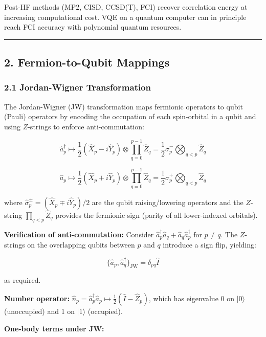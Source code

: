 \documentclass[
  11pt,
]{report}
\begin{document}
Post-HF methods (MP2, CISD, CCSD(T), FCI) recover correlation energy at
increasing computational cost. VQE on a quantum computer can in
principle reach FCI accuracy with polynomial quantum resources.

\begin{center}\rule{0.5\linewidth}{0.5pt}\end{center}

\subsection{2. Fermion-to-Qubit
Mappings}\label{fermion-to-qubit-mappings}

\subsubsection{2.1 Jordan-Wigner
Transformation}\label{jordan-wigner-transformation}

The Jordan-Wigner (JW) transformation maps fermionic operators to qubit
(Pauli) operators by encoding the occupation of each spin-orbital in a
qubit and using \(Z\)-strings to enforce anti-commutation:

\[\hat{a}_p^\dagger \mapsto \frac{1}{2}(\hat{X}_p - i\hat{Y}_p) \otimes \prod_{q=0}^{p-1} \hat{Z}_q = \frac{1}{2}\hat{\sigma}_p^- \bigotimes_{q<p} \hat{Z}_q\]

\[\hat{a}_p \mapsto \frac{1}{2}(\hat{X}_p + i\hat{Y}_p) \otimes \prod_{q=0}^{p-1} \hat{Z}_q = \frac{1}{2}\hat{\sigma}_p^+ \bigotimes_{q<p} \hat{Z}_q\]

where \(\hat{\sigma}_p^{\pm} = (\hat{X}_p \mp i\hat{Y}_p)/2\) are the
qubit raising/lowering operators and the \(Z\)-string
\(\prod_{q<p}\hat{Z}_q\) provides the fermionic sign (parity of all
lower-indexed orbitals).

\textbf{Verification of anti-commutation:} Consider
\(\hat{a}_p^\dagger \hat{a}_q + \hat{a}_q \hat{a}_p^\dagger\) for
\(p \neq q\). The \(Z\)-strings on the overlapping qubits between \(p\)
and \(q\) introduce a sign flip, yielding:

\[\{\hat{a}_p, \hat{a}_q^\dagger\}_{\text{JW}} = \delta_{pq}\hat{I}\]

as required.

\textbf{Number operator:}
\(\hat{n}_p = \hat{a}_p^\dagger \hat{a}_p \mapsto \frac{1}{2}(\hat{I} - \hat{Z}_p)\),
which has eigenvalue 0 on \(|0\rangle\) (unoccupied) and 1 on
\(|1\rangle\) (occupied).

\textbf{One-body terms under JW:}
\end{document}
